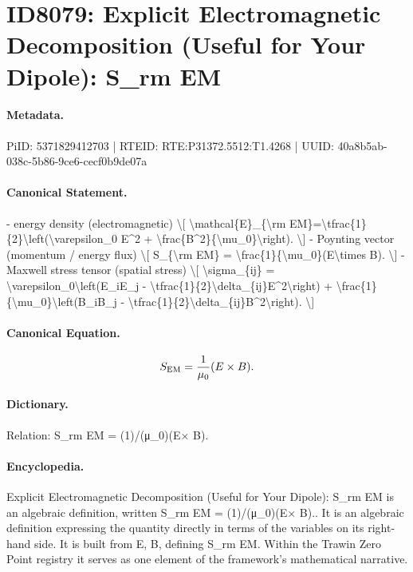 \section*{ID8079: Explicit Electromagnetic Decomposition (Useful for Your Dipole): S\_rm EM}
\paragraph{Metadata.}
PiID: 5371829412703 | RTEID: RTE:P31372.5512:T1.4268 | UUID: 40a8b5ab-038c-5b86-9ce6-cecf0b9de07a

\paragraph{Canonical Statement.}
- energy density (electromagnetic) \textbackslash{}[ \textbackslash{}mathcal\{E\}\_\{\textbackslash{}rm EM\}=\textbackslash{}tfrac\{1\}\{2\}\textbackslash{}left(\textbackslash{}varepsilon\_0 E\textasciicircum{}2 + \textbackslash{}frac\{B\textasciicircum{}2\}\{\textbackslash{}mu\_0\}\textbackslash{}right). \textbackslash{}] - Poynting vector (momentum / energy flux) \textbackslash{}[ S\_\{\textbackslash{}rm EM\} = \textbackslash{}frac\{1\}\{\textbackslash{}mu\_0\}(E\textbackslash{}times B). \textbackslash{}] - Maxwell stress tensor (spatial stress) \textbackslash{}[ \textbackslash{}sigma\_\{ij\} = \textbackslash{}varepsilon\_0\textbackslash{}left(E\_iE\_j - \textbackslash{}tfrac\{1\}\{2\}\textbackslash{}delta\_\{ij\}E\textasciicircum{}2\textbackslash{}right) + \textbackslash{}frac\{1\}\{\textbackslash{}mu\_0\}\textbackslash{}left(B\_iB\_j - \textbackslash{}tfrac\{1\}\{2\}\textbackslash{}delta\_\{ij\}B\textasciicircum{}2\textbackslash{}right). \textbackslash{}]

\paragraph{Canonical Equation.}
\[
S_{\rm EM} = \frac{1}{\mu_0}(E\times B).
\]

\paragraph{Dictionary.}
Relation: S\_rm EM = (1)/(μ\_0)(E× B).

\paragraph{Encyclopedia.}
Explicit Electromagnetic Decomposition (Useful for Your Dipole): S\_rm EM is an algebraic definition, written S\_rm EM = (1)/(μ\_0)(E× B).. It is an algebraic definition expressing the quantity directly in terms of the variables on its right-hand side. It is built from E, B, defining S\_rm EM. Within the Trawin Zero Point registry it serves as one element of the framework's mathematical narrative.
